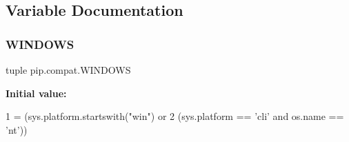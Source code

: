 \subsection{Variable Documentation}
\mbox{\label{namespacepip_1_1compat_a105f0bbd10e2a25e1ae4f89a42021a23}} 
\subsubsection{\texorpdfstring{W\+I\+N\+D\+O\+WS}{WINDOWS}}
{\footnotesize\ttfamily tuple pip.\+compat.\+W\+I\+N\+D\+O\+WS}

{\bfseries Initial value\+:}
\begin{DoxyCode}
1 =  (sys.platform.startswith(\textcolor{stringliteral}{"win"}) \textcolor{keywordflow}{or}
2            (sys.platform == \textcolor{stringliteral}{'cli'} \textcolor{keywordflow}{and} os.name == \textcolor{stringliteral}{'nt'}))
\end{DoxyCode}
